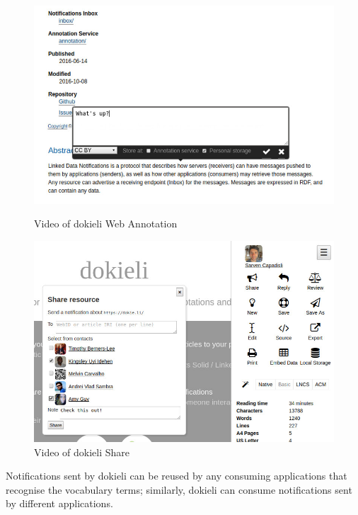 \documentclass[a4paper]{llncs}
\begin{document}
\begin{figure}
  \begin{minipage}[b]{.49\textwidth}
    \includegraphics[width=\textwidth]{media/images/dokieli-annotation}
    \caption{Video of dokieli Web Annotation}
    \label{fig:video-annotation}
  \end{minipage}
  \hfill
  \begin{minipage}[b]{.49\textwidth}
    \includegraphics[width=\textwidth]{media/images/dokieli-share}
    \caption{Video of dokieli Share}
    \label{fig:video-share}
  \end{minipage}
\end{figure}






\par Notifications sent by dokieli can be reused by any consuming applications that recognise the vocabulary terms; similarly, dokieli can consume notifications sent by different applications.
\end{document}
